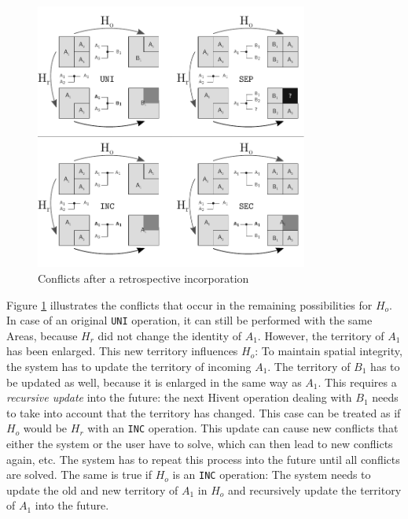 \begin{figure}[ht]
\vspace{1em}
  \centering
  \includegraphics[width=0.8\textwidth]{graphics/development/editing_hivent_data/retrospective_updates/INC}
  \caption{Conflicts after a retrospective incorporation}
  \label{fig:update_conflict_INC}
\end{figure}

Figure \ref{fig:update_conflict_INC} illustrates the conflicts that occur in the remaining possibilities for $H_o$. In case of an original \texttt{UNI} operation, it can still be performed with the same Areas, because $H_r$ did not change the identity of $A_1$. However, the territory of $A_1$ has been enlarged. This new territory influences $H_o$: To maintain spatial integrity, the system has to update the territory of incoming $A_1$. The territory of $B_1$ has to be updated as well, because it is enlarged in the same way as $A_1$. This requires a \emph{recursive update} into the future: the next Hivent operation dealing with $B_1$ needs to take into account that the territory has changed. This case can be treated as if $H_o$ would be $H_r$ with an \texttt{INC} operation. This update can cause new conflicts that either the system or the user have to solve, which can then lead to new conflicts again, etc. The system has to repeat this process into the future until all conflicts are solved. The same is true if $H_o$ is an \texttt{INC} operation: The system needs to update the old and new territory of $A_1$ in $H_o$ and recursively update the territory of $A_1$ into the future.

